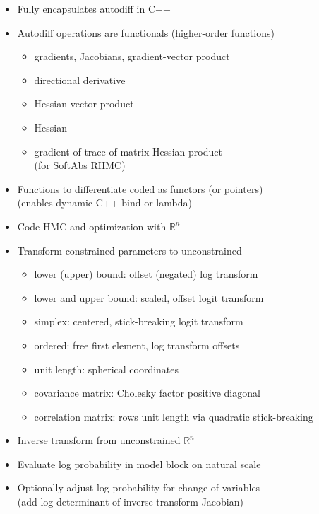 \documentclass[10pt]{report}
\newcommand{\sld}[1]{\newpage{\noindent\LARGE \ \ \
    \textcolor{MidnightBlue}{\bfseries #1}}\vspace*{4pt}}
\newcommand{\myemph}[1]{{\color{MidnightBlue}{\bfseries #1}}}
\begin{document}
\sld{Autodiff Functionals}

\begin{itemize}
\item Fully encapsulates autodiff in C++
\item Autodiff operations are functionals {\footnotesize (higher-order functions)}
\begin{itemize}\small
\item gradients, Jacobians, gradient-vector product
\item directional derivative
\item Hessian-vector product
\item Hessian
\item gradient of trace of matrix-Hessian product
\\ {\footnotesize (for SoftAbs RHMC)}
\end{itemize}
\item Functions to differentiate coded as functors (or pointers)
\\ {\footnotesize (enables dynamic C++ bind or lambda)}
\end{itemize}

\sld{Variable Transforms}
\begin{itemize}
\item Code HMC and optimization with $\mathbb{R}^n$ \myemph{support}
\item Transform constrained parameters to unconstrained
\vspace*{-2pt}
{\small
\begin{itemize}
\item lower (upper) bound: offset (negated) log transform
\item lower and upper bound: scaled, offset logit transform
\item simplex: centered, stick-breaking logit transform
\item ordered: free first element, log transform offsets
\item unit length: spherical coordinates
\item covariance matrix: Cholesky factor positive diagonal 
\item correlation matrix: rows unit length via quadratic stick-breaking
\end{itemize}
}
\end{itemize}


\sld{Variable Transforms (cont.)}
\begin{itemize}
\item Inverse transform from unconstrained $\mathbb{R}^n$
\item Evaluate log probability in model block on natural scale
\item Optionally adjust log probability for change of variables
\\ {\footnotesize (add log determinant of inverse transform Jacobian)}
\end{itemize}
\end{document}
